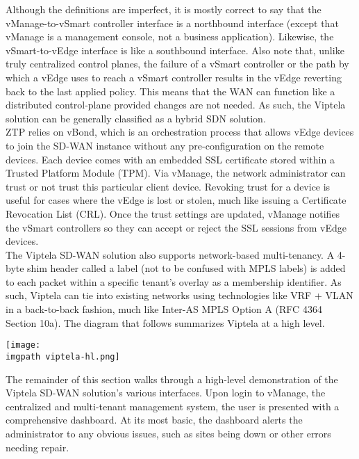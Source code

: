 Although the definitions are imperfect, it is mostly correct to say that the
vManage-to-vSmart controller interface is a northbound interface (except that
vManage is a management console, not a business application). Likewise, the
vSmart-to-vEdge interface is like a southbound interface. Also note that,
unlike truly centralized control planes, the failure of a vSmart controller or
the path by which a vEdge uses to reach a vSmart controller results in the
vEdge reverting back to the last applied policy. This means that the WAN can
function like a distributed control-plane provided changes are not needed. As
such, the Viptela solution can be generally classified as a hybrid SDN solution. \\

ZTP relies on vBond, which is an orchestration process that allows vEdge
devices to join the SD-WAN instance without any pre-configuration on the
remote devices. Each device comes with an embedded SSL certificate stored
within a Trusted Platform Module (TPM). Via vManage, the network administrator
can trust or not trust this particular client device. Revoking trust for a
device is useful for cases where the vEdge is lost or stolen, much like
issuing a Certificate Revocation List (CRL). Once the trust settings are
updated, vManage notifies the vSmart controllers so they can accept or reject
the SSL sessions from vEdge devices. \\

The Viptela SD-WAN solution also supports network-based multi-tenancy. A
4-byte shim header called a label (not to be confused with MPLS labels) is
added to each packet within a specific tenant’s overlay as a membership
identifier. As such, Viptela can tie into existing networks using technologies
like VRF + VLAN in a back-to-back fashion, much like Inter-AS MPLS Option A
(RFC 4364 Section 10a). The diagram that follows summarizes Viptela at a high level.

    \begin{minipage}[t]{\linewidth}
	  \centering
      \texttt{[image: \\imgpath viptela-hl.png]}
    \end{minipage}

The remainder of this section walks through a high-level demonstration of the
Viptela SD-WAN solution's various interfaces. Upon login to vManage, the
centralized and multi-tenant management system, the user is presented with a
comprehensive dashboard. At its most basic, the dashboard alerts the
administrator to any obvious issues, such as sites being down or other errors
needing repair.

